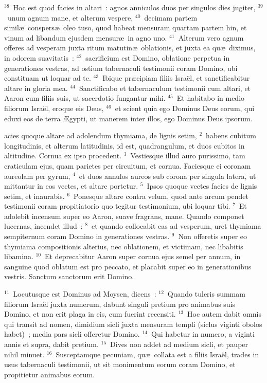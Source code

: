 ${}^{38}$~Hoc est quod facies in altari~: agnos anniculos duos per singulos dies jugiter,
${}^{39}$~unum agnum mane, et alterum vespere,
${}^{40}$~decimam partem simil\ae\ conspers\ae\ oleo tuso, quod habeat mensuram quartam partem hin, et vinum ad libandum ejusdem mensur\ae\ in agno uno.
${}^{41}$~Alterum vero agnum offeres ad vesperam juxta ritum matutin\ae\ oblationis, et juxta ea qu\ae\ diximus, in odorem suavitatis~:
${}^{42}$~sacrificium est Domino, oblatione perpetua in generationes vestras, ad ostium tabernaculi testimonii coram Domino, ubi constituam ut loquar ad te.
${}^{43}$~Ibique pr\ae cipiam filiis Isra\"el, et sanctificabitur altare in gloria mea.
${}^{44}$~Sanctificabo et tabernaculum testimonii cum altari, et Aaron cum filiis suis, ut sacerdotio fungantur mihi.
${}^{45}$~Et habitabo in medio filiorum Isra\"el, eroque eis Deus,
${}^{46}$~et scient quia ego Dominus Deus eorum, qui eduxi eos de terra \AE gypti, ut manerem inter illos, ego Dominus Deus ipsorum.

\bchapter
{}acies quoque altare ad adolendum thymiama, de lignis setim,
${}^{2}$~habens cubitum longitudinis, et alterum latitudinis, id est, quadrangulum, et duos cubitos in altitudine. Cornua ex ipso procedent.
${}^{3}$~Vestiesque illud auro purissimo, tam craticulam ejus, quam parietes per circuitum, et cornua. Faciesque ei coronam aureolam per gyrum,
${}^{4}$~et duos annulos aureos sub corona per singula latera, ut mittantur in eos vectes, et altare portetur.
${}^{5}$~Ipsos quoque vectes facies de lignis setim, et inaurabis.
${}^{6}$~Ponesque altare contra velum, quod ante arcum pendet testimonii coram propitiatorio quo tegitur testimonium, ubi loquar tibi.
${}^{7}$~Et adolebit incensum super eo Aaron, suave fragrans, mane. Quando componet lucernas, incendet illud~:
${}^{8}$~et quando collocabit eas ad vesperum, uret thymiama sempiternum coram Domino in generationes vestras.
${}^{9}$~Non offeretis super eo thymiama compositionis alterius, nec oblationem, et victimam, nec libabitis libamina.
${}^{10}$~Et deprecabitur Aaron super cornua ejus semel per annum, in sanguine quod oblatum est pro peccato, et placabit super eo in generationibus vestris. Sanctum sanctorum erit Domino.


${}^{11}$~Locutusque est Dominus ad Moysen, dicens~:
${}^{12}$~Quando tuleris summam filiorum Isra\"el juxta numerum, dabunt singuli pretium pro animabus suis Domino, et non erit plaga in eis, cum fuerint recensiti.
${}^{13}$~Hoc autem dabit omnis qui transit ad nomen, dimidium sicli juxta mensuram templi (siclus viginti obolos habet)~; media pars sicli offeretur Domino.
${}^{14}$~Qui habetur in numero, a viginti annis et supra, dabit pretium.
${}^{15}$~Dives non addet ad medium sicli, et pauper nihil minuet.
${}^{16}$~Susceptamque pecuniam, qu\ae\ collata est a filiis Isra\"el, trades in usus tabernaculi testimonii, ut sit monimentum eorum coram Domino, et propitietur animabus eorum.


